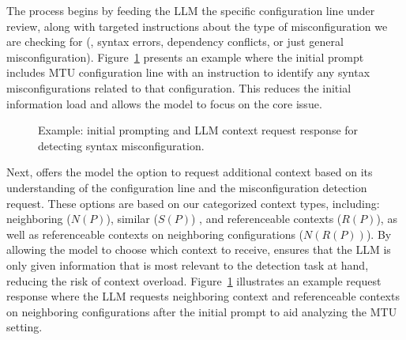  The process begins by feeding the LLM the specific configuration line under review, along with targeted instructions about the type of misconfiguration we are checking for (\eg, syntax errors, dependency conflicts, or just general misconfiguration).
Figure~\ref{fig:initial_prompt} presents an example where the initial prompt
includes MTU configuration line with an instruction to identify any
syntax misconfigurations related to that configuration.
This reduces the initial information load and allows the model to focus on the core issue.


    \begin{figure}[tb]
    \centering
    \caption{Example: initial prompting and LLM context request response for detecting syntax misconfiguration.}
    \label{fig:initial_prompt}
\end{figure}

 Next, \sysname{} offers the model the option to request additional context based on its understanding of the configuration line and the misconfiguration detection request. These options are based on our categorized context types, including: neighboring (\( N(P) \)), similar (\(S(P) \)) , and referenceable contexts (\( R(P) \)), as well as referenceable contexts on neighboring configurations (\( N(R(P)) \)). By allowing the model to choose which context to receive, \sysname{} ensures that the LLM is only given information that is most relevant to the detection task at hand, reducing the risk of context overload. Figure~\ref{fig:initial_prompt} illustrates an example request response
where the LLM requests neighboring context and referenceable contexts on neighboring configurations after the initial prompt to aid analyzing the MTU setting.
    
